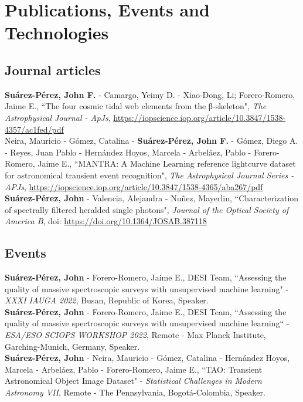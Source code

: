 \documentclass[10pt, a4paper]{article}
\newcommand{\years}[1]{\marginnote{\scriptsize #1}}
\begin{document}
\section*{Publications, Events and Technologies}

\subsection*{Journal articles}
\noindent
\years{2021}\textbf{Suárez-Pérez, John F.} - Camargo, Yeimy D. - Xiao-Dong, Li; Forero-Romero, Jaime E., “The four cosmic tidal web elements from the β-skeleton", \emph{The Astrophysical Journal - ApJs}, \url{https://iopscience.iop.org/article/10.3847/1538-4357/ac1fed/pdf}
\\

\years{2020}Neira, Mauricio - Gómez, Catalina - \textbf{Suárez-Pérez, John F.} - Gómez, Diego A. - Reyes, Juan Pablo - Hernández Hoyos, Marcela - Arbeláez, Pablo - Forero-Romero, Jaime E., “MANTRA: A Machine Learning reference lightcurve dataset for astronomical transient event recognition", \emph{The Astrophysical Journal Series - APJs}, \url{https://iopscience.iop.org/article/10.3847/1538-4365/aba267/pdf} 
\\

\years{2020}\textbf{Suárez-Pérez, John} - Valencia, Alejandra - Nuñez, Mayerlin, “Characterization of spectrally filtered heralded single photons", \emph{Journal of the Optical Society of America B}, doi: \url{https://doi.org/10.1364/JOSAB.387118}

\subsection*{Events}
\noindent

\years{2022}\textbf{Suárez-Pérez, John} - Forero-Romero, Jaime E., DESI Team, “Assessing the quality of massive spectroscopic surveys with unsupervised machine learning" - \emph{XXXI IAUGA 2022},  Busan, Republic of Korea, Speaker.\\

\years{2022}\textbf{Suárez-Pérez, John} - Forero-Romero, Jaime E., DESI Team,  “Assessing the quality of massive spectroscopic surveys with unsupervised machine learning“ - \emph{ESA/ESO SCIOPS WORKSHOP 2022}, Remote - Max Planck Institute, Garching-Munich, Germany, Speaker.\\

\years{2021}\textbf{Suárez-Pérez, John} - Neira, Mauricio - Gómez, Catalina - Hernández Hoyos, Marcela - Arbeláez, Pablo - Forero-Romero, Jaime E., “TAO: Transient Astronomical Object Image Dataset" - \emph{Statistical Challenges in Modern Astronomy VII}, Remote - The Pennsylvania, Bogotá-Colombia, Speaker.\\
\end{document}
